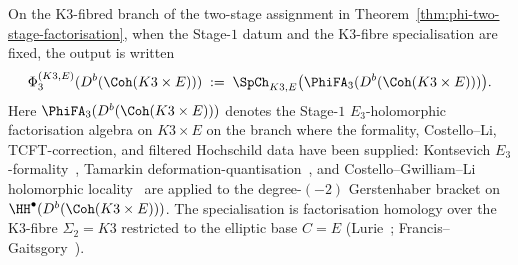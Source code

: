On the K3-fibred branch of the two-stage assignment in Theorem~\ref{thm:phi-two-stage-factorisation}, when the Stage-$1$ datum and the K3-fibre specialisation are fixed, the output is written
\[
 \Phi_3^{(K3,E)}(D^b(\Coh(K3 \times E)))
 \;:=\;
 \SpCh_{K3, E}\bigl(\PhiFA_3(D^b(\Coh(K3 \times E)))\bigr).
\]
Here $\PhiFA_3(D^b(\Coh(K3 \times E)))$ denotes the Stage-$1$ $E_3$-holomorphic factorisation algebra on $K3 \times E$ on the branch where the formality, Costello--Li, TCFT-correction, and filtered Hochschild data have been supplied: Kontsevich $E_3$-formality~\cite{Kontsevich1999}, Tamarkin deformation-quantisation~\cite{Tamarkin2007}, and Costello--Gwilliam--Li holomorphic locality~\cite{CostelloGwilliam2017,CostelloLi2016,CostelloLi2020} are applied to the degree-$(-2)$ Gerstenhaber bracket on $\HH^\bullet(D^b(\Coh(K3 \times E)))$. The specialisation is factorisation homology over the K3-fibre $\Sigma_2 = K3$ restricted to the elliptic base $C = E$ \textup{(}Lurie~\cite{LurieHA}; Francis--Gaitsgory~\cite{FrancisGaitsgory2012}\textup{).}

